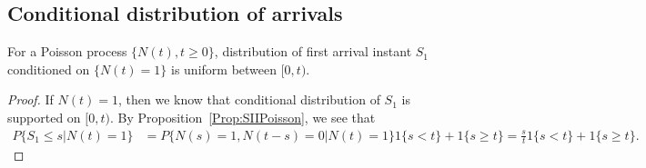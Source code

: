 \documentclass[a4paper,10pt,english]{article}
\begin{document}
\subsection{Conditional distribution of arrivals}
\begin{prop} 
For a Poisson process $\{N(t), t\geqslant 0\}$, distribution of first arrival instant $S_1$ conditioned on $\{N(t)=1\}$ is uniform between $[0,t)$.
\end{prop}
\begin{proof} If $N(t) = 1$, then we know that conditional distribution of $S_1$ is supported on $[0,t)$. By Proposition~\ref{Prop:SIIPoisson}, we see that
\begin{align*}
P\{S_1 \leq s | N(t) = 1\} &= P\{ N(s) = 1, N(t-s) = 0 | N(t) = 1\}1{\{s < t\}} + 1\{s \geq t\} = \frac{s}{t}1{\{s < t\}} + 1\{s \geq t\}.
\end{align*}
\end{proof}
\end{document}
